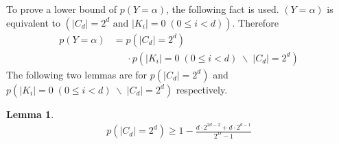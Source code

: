 \documentclass[10pt, conference, compsocconf]{IEEEtran}
\newtheorem{mylemma}{Lemma}
\begin{document}
		To prove a lower bound of $p(Y = \alpha)$, the following fact is used.
		$(Y = \alpha)$ is equivalent to $\left(|C_d| = 2^d \text{ and } |K_i| = 0	\; (0 \leq i < d)\right)$.
		Therefore 
		\begin{align*}
			p(Y = \alpha) &= p(|C_d| = 2^d)\\
				& \;\;\;\;\; \cdot p(|K_i| = 0	\; (0 \leq i < d) \; \backslash \; |C_d| = 2^d)
		\end{align*}
		The following two lemmas are for $p(|C_d| = 2^d)$ and $p(|K_i| = 0	\; (0 \leq i < d) \; \backslash \; |C_d| = 2^d)$ 
		respectively.
		
		\begin{mylemma}
			\begin{align*}
				p(|C_d| = 2^d) \geq 1-\frac{d \cdot 2^{2d-2}+d \cdot 2^{d-1}}{2^D-1}
			\end{align*}
		\end{mylemma}
		
\end{document}
